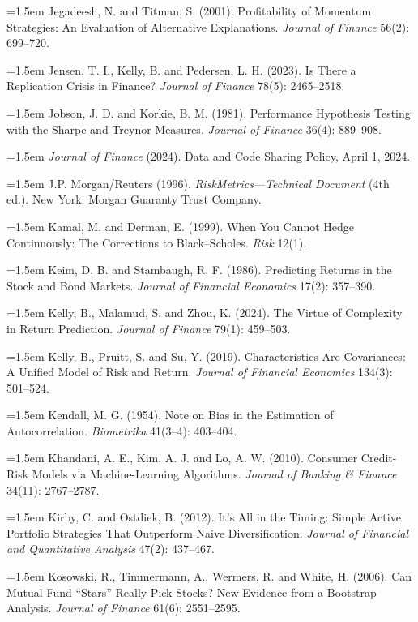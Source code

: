 \hangindent=1.5em Jegadeesh, N. and Titman, S. (2001). Profitability of Momentum Strategies: An Evaluation of Alternative Explanations. \emph{Journal of Finance} 56(2): 699--720.

\hangindent=1.5em Jensen, T. I., Kelly, B. and Pedersen, L. H. (2023). Is There a Replication Crisis in Finance? \emph{Journal of Finance} 78(5): 2465--2518.

\hangindent=1.5em Jobson, J. D. and Korkie, B. M. (1981). Performance Hypothesis Testing with the Sharpe and Treynor Measures. \emph{Journal of Finance} 36(4): 889--908.

\hangindent=1.5em \emph{Journal of Finance} (2024). Data and Code Sharing Policy, April 1, 2024.

\hangindent=1.5em J.P. Morgan/Reuters (1996). \emph{RiskMetrics---Technical Document} (4th ed.). New York: Morgan Guaranty Trust Company.

\hangindent=1.5em Kamal, M. and Derman, E. (1999). When You Cannot Hedge Continuously: The Corrections to Black--Scholes. \emph{Risk} 12(1).

\hangindent=1.5em Keim, D. B. and Stambaugh, R. F. (1986). Predicting Returns in the Stock and Bond Markets. \emph{Journal of Financial Economics} 17(2): 357--390.

\hangindent=1.5em Kelly, B., Malamud, S. and Zhou, K. (2024). The Virtue of Complexity in Return Prediction. \emph{Journal of Finance} 79(1): 459--503.

\hangindent=1.5em Kelly, B., Pruitt, S. and Su, Y. (2019). Characteristics Are Covariances: A Unified Model of Risk and Return. \emph{Journal of Financial Economics} 134(3): 501--524.

\hangindent=1.5em Kendall, M. G. (1954). Note on Bias in the Estimation of Autocorrelation. \emph{Biometrika} 41(3--4): 403--404.

\hangindent=1.5em Khandani, A. E., Kim, A. J. and Lo, A. W. (2010). Consumer Credit-Risk Models via Machine-Learning Algorithms. \emph{Journal of Banking \& Finance} 34(11): 2767--2787.

\hangindent=1.5em Kirby, C. and Ostdiek, B. (2012). It's All in the Timing: Simple Active Portfolio Strategies That Outperform Naive Diversification. \emph{Journal of Financial and Quantitative Analysis} 47(2): 437--467.

\hangindent=1.5em Kosowski, R., Timmermann, A., Wermers, R. and White, H. (2006). Can Mutual Fund ``Stars'' Really Pick Stocks? New Evidence from a Bootstrap Analysis. \emph{Journal of Finance} 61(6): 2551--2595.

